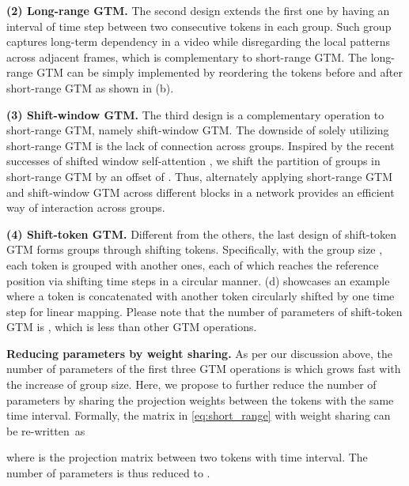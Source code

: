 \documentclass[10pt,twocolumn,letterpaper]{article}
\begin{document}
\textbf{(2) Long-range GTM.} The second design extends the first one by having an interval of  time step between two consecutive tokens in each group. Such group captures long-term dependency in a video while disregarding the local patterns across adjacent frames, which is complementary to short-range GTM. The long-range GTM can be simply implemented by reordering the tokens before and after short-range GTM as shown in (b).

\textbf{(3) Shift-window GTM.} The third design is a complementary operation to short-range GTM, namely shift-window GTM. The downside of solely utilizing short-range GTM is the lack of connection across groups. Inspired by the recent successes of shifted window self-attention \cite{liu2021swin}, we shift the partition of groups in short-range GTM by an offset of . Thus, alternately applying short-range GTM and shift-window GTM across different blocks in a network provides an efficient way of interaction across groups.

\textbf{(4) Shift-token GTM.}
Different from the others, the last design of shift-token GTM forms groups through shifting tokens. Specifically, with the group size , each token is grouped with another  ones, each of which reaches the reference position via shifting  time steps in a circular manner. (d) showcases an example where a token is concatenated with another token circularly shifted by one time step for linear mapping. Please note that the number of parameters of shift-token GTM is , which is less than other GTM operations.

\textbf{Reducing parameters by weight sharing.} As per our discussion above, the number of parameters of the first three GTM operations is  which grows fast with the increase of group size. Here, we propose to further reduce the number of parameters by sharing the projection weights between the tokens with the same time interval. Formally, the matrix  in \cref{eq:short_range} with weight sharing can be re-written~as

where  is the projection matrix between two tokens with  time interval. The number of parameters is thus reduced to .
\end{document}
